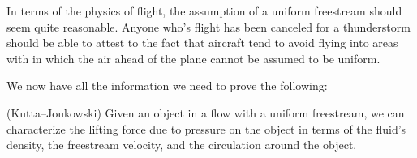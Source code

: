 \documentclass[letterpaper, twoside, 12 pt]{article}
\begin{document}
	\begin{remark}
		In terms of the physics of flight, the assumption of a uniform freestream should seem quite reasonable.
		Anyone who's flight has been canceled for a thunderstorm should be able to attest to the fact that aircraft tend to avoid flying into areas with in which the air ahead of the plane cannot be assumed to be uniform.
	\end{remark}
	We now have all the information we need to prove the following:

	\begin{theorem}(Kutta--Joukowski)
		Given an object in a flow with a uniform freestream, we can characterize the lifting force due to pressure on the object in terms of the fluid's density, the freestream velocity, and the circulation around the object.
	\end{theorem}
\end{document}
